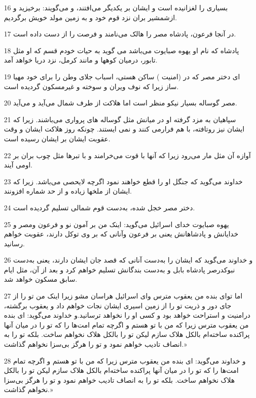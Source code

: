 \par 16 بسیاری را لغزانیده است و ایشان بر یکدیگر می‌افتند، و می‌گویند: برخیزید و ازشمشیر بران نزد قوم خود و به زمین مولد خویش برگردیم.
\par 17 در آنجا فرعون، پادشاه مصر را هالک می‌نامند و فرصت را از دست داده است.
\par 18 پادشاه که نام او یهوه صبایوت می‌باشد می گوید به حیات خودم قسم که او مثل تابور، درمیان کوهها و مانند کرمل، نزد دریا خواهد آمد.
\par 19 ‌ای دختر مصر که در (امنیت ) ساکن هستی، اسباب جلای وطن را برای خود مهیا ساز زیرا که نوف ویران و سوخته و غیرمسکون گردیده است.
\par 20 مصر گوساله بسیار نیکو منظر است اما هلاکت از طرف شمال می‌آید و می‌آید.
\par 21 سپاهیان به مزد گرفته او در میانش مثل گوساله های پرواری می‌باشند. زیرا که ایشان نیز روتافته، با هم فرارمی کنند و نمی ایستند. چونکه روز هلاکت ایشان و وقت عقوبت ایشان بر ایشان رسیده است.
\par 22 آوازه آن مثل مار می‌رود زیرا که آنها با قوت می‌خرامند و با تبرها مثل چوب بران بر اومی آیند.
\par 23 خداوند می‌گوید که جنگل او را قطع خواهند نمود اگر‌چه لایحصی می‌باشد. زیرا که ایشان از ملخها زیاده و از حد شماره افزونند.
\par 24 دختر مصر خجل شده، به‌دست قوم شمالی تسلیم گردیده است.
\par 25 یهوه صبایوت خدای اسرائیل می‌گوید: اینک من بر آمون نو و فرعون ومصر و خدایانش و پادشاهانش یعنی بر فرعون وآنانی که بر وی توکل دارند، عقوبت خواهم رسانید.
\par 26 و خداوند می‌گوید که ایشان را به‌دست آنانی که قصد جان ایشان دارند، یعنی به‌دست نبوکدرصر پادشاه بابل و به‌دست بندگانش تسلیم خواهم کرد و بعد از آن، مثل ایام سابق مسکون خواهد شد.
\par 27 اما تو‌ای بنده من یعقوب مترس و‌ای اسرائیل هراسان مشو زیرا اینک من تو را از جای دور و ذریت تو را از زمین اسیری ایشان نجات خواهم داد و یعقوب برگشته، درامنیت و استراحت خواهد بود و کسی او را نخواهد ترسانید.و خداوند می‌گوید: ای بنده من یعقوب مترس زیرا که من با تو هستم و اگر‌چه تمام امت‌ها را که تو را در میان آنها پراکنده ساخته‌ام بالکل هلاک سازم لیکن تو را بالکل هلاک نخواهم ساخت. بلکه تو را به انصاف تادیب خواهم نمود و تو را هرگز بی‌سزا نخواهم گذاشت.»
\par 28 و خداوند می‌گوید: ای بنده من یعقوب مترس زیرا که من با تو هستم و اگر‌چه تمام امت‌ها را که تو را در میان آنها پراکنده ساخته‌ام بالکل هلاک سازم لیکن تو را بالکل هلاک نخواهم ساخت. بلکه تو را به انصاف تادیب خواهم نمود و تو را هرگز بی‌سزا نخواهم گذاشت.»
 
